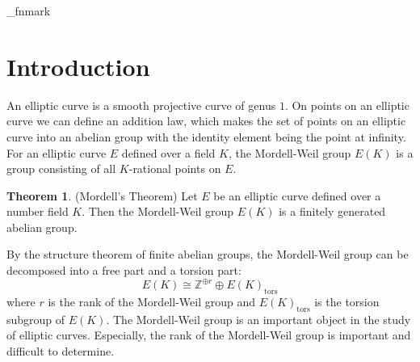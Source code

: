 \documentclass[a4paper]{jarticle} %
\theoremstyle{definition}
\newtheorem{thm}{Theorem}[section]
\theoremstyle{remark}
\begin{document}
%
%
%
\init_fnmark %

\section{Introduction}
An elliptic curve is a smooth projective curve of genus $1$.
On points on an elliptic curve we can define an addition law, which makes the set of points on an elliptic curve into an abelian group with the identity element being the point at infinity.
For an elliptic curve $E$ defined over a field $K$, the Mordell-Weil group $E(K)$ is a group consisting of all $K$-rational points on $E$.

\begin{thm}{(Mordell's Theorem)}
    \label{thm:mordell}
    Let $E$ be an elliptic curve defined over a number field $K$.
    Then the Mordell-Weil group $E(K)$ is a finitely generated abelian group.
\end{thm}
By the structure theorem of finite abelian groups, the Mordell-Weil group can be decomposed into a free part and a torsion part:
\begin{equation*}
    E(K) \cong \mathbb{Z}^{\oplus r} \oplus E(K)_{\text{tors}}
\end{equation*}
where $r$ is the rank of the Mordell-Weil group and $E(K)_{\text{tors}}$ is the torsion subgroup of $E(K)$.
The Mordell-Weil group is an important object in the study of elliptic curves.
Especially, the rank of the Mordell-Weil group is important and difficult to determine.
\end{document}
